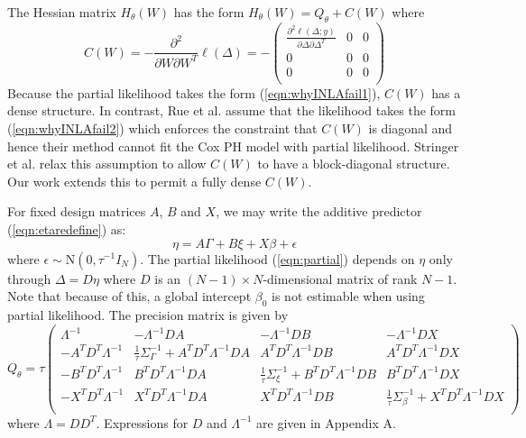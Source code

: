 \documentclass[serif,10pt]{wiley-article}
\begin{document}
The Hessian matrix $H_{\theta}(W)$ has the form $H_{\theta}(W) = Q_{\theta} + C(W)$ where
\begin{equation*}
C(W) = -\frac{\partial^{2}}{\partial W\partial W^{T}}\ell(\Delta) = -\begin{pmatrix}
\frac{\partial^{2}\ell(\Delta;y)}{\partial\Delta\partial\Delta^{T}} & 0 & 0 \\
0 & 0 & 0 \\
0 & 0 & 0 \\
\end{pmatrix}
\end{equation*}
Because the partial likelihood takes the form (\ref{eqn:whyINLAfail1}), $C(W)$ has a dense structure. In contrast, Rue et al. \cite{inla} assume that the likelihood takes the form (\ref{eqn:whyINLAfail2}) which enforces the constraint that $C(W)$ is diagonal and hence their method cannot fit the Cox PH model with partial likelihood. Stringer et al. \cite{casecross} relax this assumption to allow $C(W)$ to have a block-diagonal structure. Our work extends this to permit a fully dense $C(W)$. 

For fixed design matrices $A$, $B$ and $X$, we may write the additive predictor (\ref{eqn:etaredefine}) as:
\begin{equation}
\eta = A\Gamma + B\xi + X\beta + \epsilon
\end{equation}
where $\epsilon \sim \text{N}\left( 0,\tau^{-1}I_{N}\right)$. The partial likelihood (\ref{eqn:partial}) depends on $\eta$ only through $\Delta = D\eta$ where $D$ is an $(N -1) \times N $-dimensional matrix of rank $N -1$. Note that because of this, a global intercept $\beta_{0}$ is not estimable when using partial likelihood. The precision matrix is given by
\begin{equation}\label{eqn:precmat}
Q_{\theta} = \tau\begin{pmatrix}
\Lambda^{-1} & -\Lambda^{-1}DA & -\Lambda^{-1}DB & - \Lambda^{-1}DX \\
- A^{T}D^{T}\Lambda^{-1} & \frac{1}{\tau}\Sigma_{\Gamma}^{-1} +  A^{T}D^{T}\Lambda^{-1}DA &  A^{T}D^{T}\Lambda^{-1}DB &  A^{T}D^{T}\Lambda^{-1}DX \\
- B^{T}D^{T}\Lambda^{-1} &  B^{T}D^{T}\Lambda^{-1}DA & \frac{1}{\tau}\Sigma_{\xi}^{-1} +  B^{T}D^{T}\Lambda^{-1}DB & B^{T}D^{T}\Lambda^{-1}DX \\
- X^{T}D^{T}\Lambda^{-1} &  X^{T}D^{T}\Lambda^{-1}DA & X^{T}D^{T}\Lambda^{-1}DB & \frac{1}{\tau}\Sigma_{\beta}^{-1} +  X^{T}D^{T}\Lambda^{-1}DX \\
\end{pmatrix}
\end{equation}
where $\Lambda = DD^{T}$. Expressions for $D$ and $\Lambda^{-1}$ are given in Appendix A.
\end{document}

